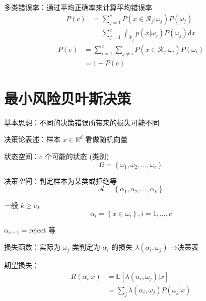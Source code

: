 \documentclass[openany]{ctexbook}
\theoremstyle{kaiti}
\theoremstyle{normal}
\begin{document}
多类错误率：通过平均正确率来计算平均错误率
\begin{equation}
\begin{aligned}
  P\left(c \right)
  &=\sum_{j=1}^c{P\left(x\in \mathcal{R}_j|\omega_j \right)P\left(\omega_j \right)}\\
  &=\sum_{j=1}^c{\int_{\mathcal{R}_j}{p\left(x|\omega_j \right)P\left(\omega_j \right)}}\mathrm{d}x
\end{aligned}
\end{equation}
\begin{equation}
\begin{aligned}
  P\left(e \right)
  &=\sum_{i=1}^c{\sum_{j\ne i}{P\left(x\in \mathcal{R}_j|\omega_i \right)P\left(\omega_i \right)}}\\
  &=1-P\left(c \right)
\end{aligned}
\end{equation}

\section{最小风险贝叶斯决策}

基本思想：不同的决策错误所带来的损失可能不同

决策论表述：样本 $x\in\mathbb{R}^d$ 看做随机向量

状态空间：$c$ 个可能的状态 (类别) 
\begin{equation}
\Omega =\left\{ \omega_1,\omega_2,\dots ,\omega_c \right\}
\end{equation}

决策空间：判定样本为某类或拒绝等
\begin{equation}
\mathcal{A} =\left\{ \alpha_1,\alpha_2,\dots ,\alpha_k \right\}
\end{equation}

一般 $k\geqslant c$，
\begin{equation}
\alpha_i=\left\{ x\in \omega_i \right\} , i=1,\dots ,c
\end{equation}

$\alpha_{c+1}=\mathrm{reject}$ 等

损失函数：实际为 $\omega_j$ 类判定为 $\alpha_i$ 的损失 $\lambda \left(\alpha_i,\omega_j \right)$ →决策表

期望损失：
\begin{equation}
\begin{aligned}
  R\left(\alpha_i|x \right)
  &=\mathbb{E} \left[\lambda \left(\alpha_i,\omega_j \right)|x \right]\\
  &=\sum_j\lambda \left(\alpha_i,\omega_j \right)P\left(\omega_j|x \right)
\end{aligned}
\end{equation}
\end{document}
